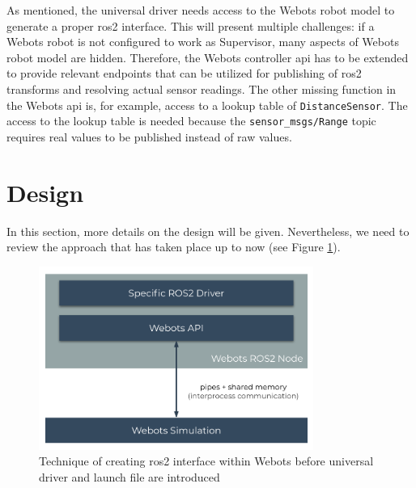 As mentioned, the universal driver needs access to the Webots robot model to generate a proper \ac{ros2} interface.
This will present multiple challenges:
if a Webots robot is not configured to work as Supervisor, many aspects of Webots robot model are hidden.
Therefore, the Webots controller \ac{api} has to be extended to provide relevant endpoints that can be utilized for publishing of \ac{ros2} transforms and resolving actual sensor readings.
The other missing function in the Webots \ac{api} is, for example, access to a lookup table of \texttt{DistanceSensor}.
The access to the lookup table is needed because the \texttt{sensor\_msgs/Range} topic requires real values to be published instead of raw values.



\section{Design}

In this section, more details on the design will be given. Nevertheless, we need to review the approach that has taken place up to now (see Figure \ref{fig:generalization:ros2_driver_within_webots}). 

\begin{figure}[H]
    \centering
    \includegraphics[width=0.8\textwidth]{generalization/figures/ros2_driver_within_webots.pdf}
    \caption{Technique of creating \ac{ros2} interface within Webots before universal driver and launch file are introduced}
    \label{fig:generalization:ros2_driver_within_webots}
\end{figure}

